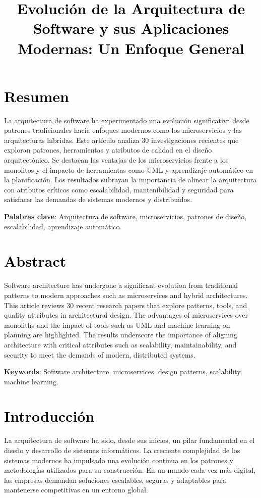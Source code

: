 \documentclass[12pt,a4paper]{article}
\title{\textbf{\textcolor{black}{Evolución de la Arquitectura de Software y sus Aplicaciones Modernas: Un Enfoque General}}}
\author{Aura María Fierro Fierro \\ Análisis y Desarrollo de Software \\ Sena Industrial \\ \href{auramariafierrofierro@gmail.com}}
\date{}
\begin{document}
\maketitle

\begin{multicols}{2}

\section*{\textcolor{black}{Resumen}}
La arquitectura de software ha experimentado una evolución significativa desde patrones tradicionales hacia enfoques modernos como los microservicios y las arquitecturas híbridas. Este artículo analiza 30 investigaciones recientes que exploran patrones, herramientas y atributos de calidad en el diseño arquitectónico. Se destacan las ventajas de los microservicios frente a los monolitos y el impacto de herramientas como UML y aprendizaje automático en la planificación. Los resultados subrayan la importancia de alinear la arquitectura con atributos críticos como escalabilidad, mantenibilidad y seguridad para satisfacer las demandas de sistemas modernos y distribuidos.

\textbf{Palabras clave}: Arquitectura de software, microservicios, patrones de diseño, escalabilidad, aprendizaje automático.

\section*{\textcolor{black}{Abstract}}
Software architecture has undergone a significant evolution from traditional patterns to modern approaches such as microservices and hybrid architectures. This article reviews 30 recent research papers that explore patterns, tools, and quality attributes in architectural design. The advantages of microservices over monoliths and the impact of tools such as UML and machine learning on planning are highlighted. The results underscore the importance of aligning architecture with critical attributes such as scalability, maintainability, and security to meet the demands of modern, distributed systems.

\textbf{Keywords}: Software architecture, microservices, design patterns, scalability, machine learning.

\section{\textcolor{black}{Introducción}}
La arquitectura de software ha sido, desde sus inicios, un pilar fundamental en el diseño y desarrollo de sistemas informáticos. La creciente complejidad de los sistemas modernos ha impulsado una evolución continua en los patrones y metodologías utilizados para su construcción. En un mundo cada vez más digital, las empresas demandan soluciones escalables, seguras y adaptables para mantenerse competitivas en un entorno global.


\end{multicols}
\end{document}
